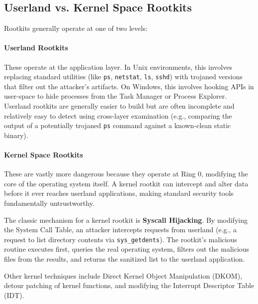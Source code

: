 \subsection{Userland vs. Kernel Space Rootkits}
Rootkits generally operate at one of two levels:

\paragraph{Userland Rootkits}
These operate at the application layer. In Unix environments, this involves replacing standard utilities (like \texttt{ps}, \texttt{netstat}, \texttt{ls}, \texttt{sshd}) with trojaned versions that filter out the attacker's artifacts. On Windows, this involves hooking APIs in user-space to hide processes from the Task Manager or Process Explorer. Userland rootkits are generally easier to build but are often incomplete and relatively easy to detect using cross-layer examination (e.g., comparing the output of a potentially trojaned \texttt{ps} command against a known-clean static binary).

\paragraph{Kernel Space Rootkits}
These are vastly more dangerous because they operate at Ring 0, modifying the core of the operating system itself. A kernel rootkit can intercept and alter data before it ever reaches userland applications, making standard security tools fundamentally untrustworthy.

The classic mechanism for a kernel rootkit is \textbf{Syscall Hijacking}. By modifying the System Call Table, an attacker intercepts requests from userland (e.g., a request to list directory contents via \texttt{sys\_getdents}). The rootkit's malicious routine executes first, queries the real operating system, filters out the malicious files from the results, and returns the sanitized list to the userland application.

Other kernel techniques include Direct Kernel Object Manipulation (DKOM), detour patching of kernel functions, and modifying the Interrupt Descriptor Table (IDT).


